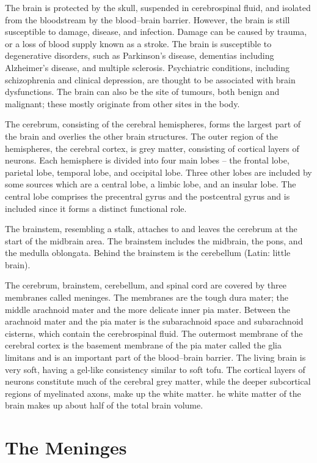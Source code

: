 The brain is protected by the skull, suspended in cerebrospinal fluid, and isolated from the bloodstream by the blood--brain barrier. However, the brain is still susceptible to damage, disease, and infection. Damage can be caused by trauma, or a loss of blood supply known as a stroke. The brain is susceptible to degenerative disorders, such as Parkinson's disease, dementias including Alzheimer's disease, and multiple sclerosis. Psychiatric conditions, including schizophrenia and clinical depression, are thought to be associated with brain dysfunctions. The brain can also be the site of tumours, both benign and malignant; these mostly originate from other sites in the body.

The cerebrum, consisting of the cerebral hemispheres, forms the largest part of the brain and overlies the other brain structures. The outer region of the hemispheres, the cerebral cortex, is grey matter, consisting of cortical layers of neurons. Each hemisphere is divided into four main lobes -- the frontal lobe, parietal lobe, temporal lobe, and occipital lobe. Three other lobes are included by some sources which are a central lobe, a limbic lobe, and an insular lobe. The central lobe comprises the precentral gyrus and the postcentral gyrus and is included since it forms a distinct functional role.

The brainstem, resembling a stalk, attaches to and leaves the cerebrum at the start of the midbrain area. The brainstem includes the midbrain, the pons, and the medulla oblongata. Behind the brainstem is the cerebellum (Latin: little brain).

The cerebrum, brainstem, cerebellum, and spinal cord are covered by three membranes called meninges. The membranes are the tough dura mater; the middle arachnoid mater and the more delicate inner pia mater. Between the arachnoid mater and the pia mater is the subarachnoid space and subarachnoid cisterns, which contain the cerebrospinal fluid. The outermost membrane of the cerebral cortex is the basement membrane of the pia mater called the glia limitans and is an important part of the blood--brain barrier. The living brain is very soft, having a gel-like consistency similar to soft tofu. The cortical layers of neurons constitute much of the cerebral grey matter, while the deeper subcortical regions of myelinated axons, make up the white matter. he white matter of the brain makes up about half of the total brain volume.

\hypertarget{the-meninges}{%
\section{The Meninges}\label{the-meninges}}

